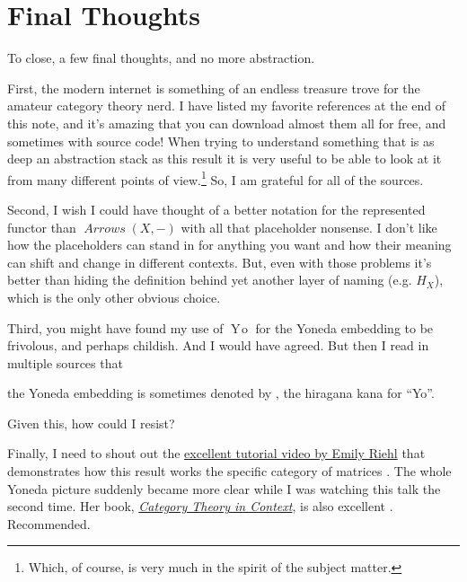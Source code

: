 \documentclass[12pt]{article}
\theoremstyle{definition}
\theoremstyle{definition}
\theoremstyle{definition}
\numberwithin{equation}{section}
\newcommand{\h}{H}                      %
\DeclareMathOperator{\Arrows}{\mathit{Arrows}}
\newcommand{\yo}{\text{\usefont{U}{min}{m}{n}\symbol{'210}}}
\newcommand{\Yo}{\mathop{Y\!o}}
\begin{document}
\section{Final Thoughts}

To close, a few final thoughts, and no more abstraction.

First, the modern internet is something of an endless treasure trove for the amateur category theory nerd.
I have listed my favorite references at the end of this note, and it's amazing that you can download
almost them all for free, and sometimes with source code! When trying to understand something that is as 
deep an abstraction stack as this result it is very useful to be able to look at it from many different
points of view.\footnote{Which, of course, is very much in the spirit of the subject matter.}
So, I am grateful for all of the sources. 

Second, I wish I could have thought of a better notation for the represented functor
than $\Arrows(X,-)$ with all that placeholder nonsense. I don't like how the placeholders
can stand in for anything you want and how their meaning can shift and change in different contexts.
But, even with those problems it's better than hiding the definition behind yet another
layer of naming (e.g. $\h_X$), which is the only other obvious choice. 

Third, you might have found my use of $\Yo$ for the Yoneda embedding to be frivolous, and perhaps
childish. And I would have agreed. But then I read in multiple sources that
\begin{CJK}{UTF8}{min}
the Yoneda embedding is sometimes denoted by \!\!\yo, the hiragana kana for ``Yo''.
\end{CJK}
Given this, how could I resist?

Finally, I need to shout out the 
\href{https://www.youtube.com/watch?v=SsgEvrDFJsM}{excellent tutorial video by Emily Riehl} 
that demonstrates how this result works
the specific category of matrices \cite{Riehl2020}. The whole Yoneda picture suddenly
became more clear while I was watching this talk the second time.
Her book, \href{https://emilyriehl.github.io/files/context.pdf}{\it Category
Theory in Context}, is also excellent \cite{Riehl2016}. Recommended.

\newpage
\end{document}
